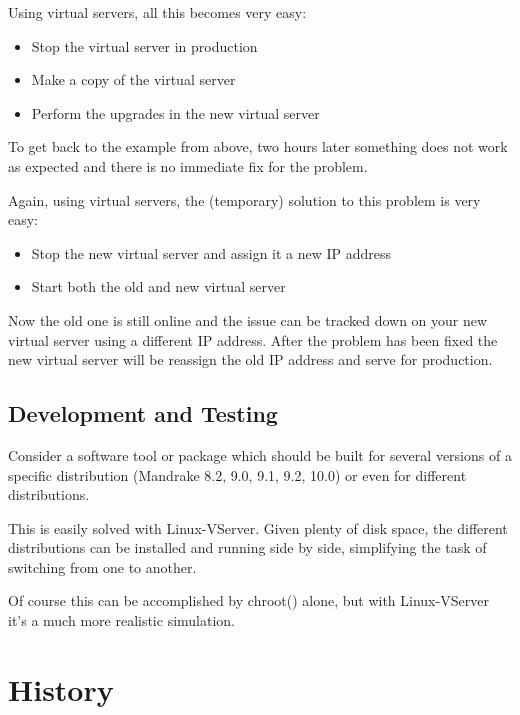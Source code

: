 Using virtual servers, all this becomes very easy:

\begin{itemize}
	\item Stop the virtual server in production
	\item Make a copy of the virtual server
	\item Perform the upgrades in the new virtual server
\end{itemize}

To get back to the example from above, two hours later something does not work
as expected and there is no immediate fix for the problem.

Again, using virtual servers, the (temporary) solution to this problem is very
easy:

\begin{itemize}
	\item Stop the new virtual server and assign it a new IP address
	\item Start both the old and new virtual server
\end{itemize}

Now the old one is still online and the issue can be tracked down on your new
virtual server using a different IP address. After the problem has been fixed
the new virtual server will be reassign the old IP address and serve for
production.


\subsection{Development and Testing}

Consider a software tool or package which should be built for several versions
of a specific distribution (Mandrake 8.2, 9.0, 9.1, 9.2, 10.0) or even for
different distributions.

This is easily solved with Linux-VServer. Given plenty of disk space, the
different distributions can be installed and running side by side, simplifying
the task of switching from one to another.

Of course this can be accomplished by chroot() alone, but with Linux-VServer
it's a much more realistic simulation.


\section{History}
\label{sec:intro:vserver:history}

